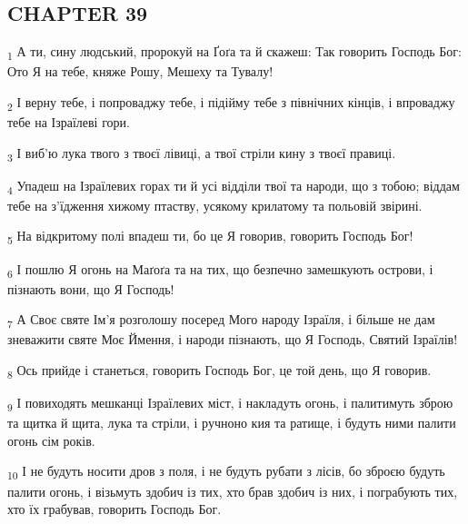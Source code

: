 \subsection{CHAPTER 39}
\begin{tcolorbox}
\textsubscript{1} А ти, сину людський, пророкуй на Ґоґа та й скажеш: Так говорить Господь Бог: Ото Я на тебе, княже Рошу, Мешеху та Тувалу!
\end{tcolorbox}
\begin{tcolorbox}
\textsubscript{2} І верну тебе, і попроваджу тебе, і підійму тебе з північних кінців, і впроваджу тебе на Ізраїлеві гори.
\end{tcolorbox}
\begin{tcolorbox}
\textsubscript{3} І виб'ю лука твого з твоєї лівиці, а твої стріли кину з твоєї правиці.
\end{tcolorbox}
\begin{tcolorbox}
\textsubscript{4} Упадеш на Ізраїлевих горах ти й усі відділи твої та народи, що з тобою; віддам тебе на з'їдження хижому птаству, усякому крилатому та польовій звірині.
\end{tcolorbox}
\begin{tcolorbox}
\textsubscript{5} На відкритому полі впадеш ти, бо це Я говорив, говорить Господь Бог!
\end{tcolorbox}
\begin{tcolorbox}
\textsubscript{6} І пошлю Я огонь на Маґоґа та на тих, що безпечно замешкують острови, і пізнають вони, що Я Господь!
\end{tcolorbox}
\begin{tcolorbox}
\textsubscript{7} А Своє святе Ім'я розголошу посеред Мого народу Ізраїля, і більше не дам зневажити святе Моє Ймення, і народи пізнають, що Я Господь, Святий Ізраїлів!
\end{tcolorbox}
\begin{tcolorbox}
\textsubscript{8} Ось прийде і станеться, говорить Господь Бог, це той день, що Я говорив.
\end{tcolorbox}
\begin{tcolorbox}
\textsubscript{9} І повиходять мешканці Ізраїлевих міст, і накладуть огонь, і палитимуть зброю та щитка й щита, лука та стріли, і ручноно кия та ратище, і будуть ними палити огонь сім років.
\end{tcolorbox}
\begin{tcolorbox}
\textsubscript{10} І не будуть носити дров з поля, і не будуть рубати з лісів, бо зброєю будуть палити огонь, і візьмуть здобич із тих, хто брав здобич із них, і пограбують тих, хто їх грабував, говорить Господь Бог.
\end{tcolorbox}

